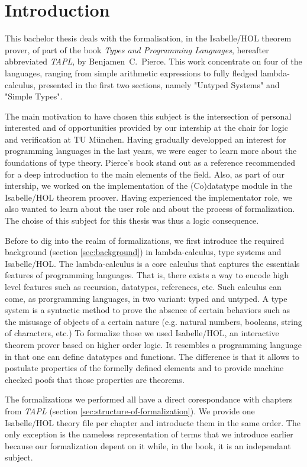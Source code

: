\section{Introduction}

This bachelor thesis deals with the formalisation, in the Isabelle/HOL theorem prover, of part of
the book \emph{Types and Programming Languages}, hereafter abbreviated \emph{TAPL}, by
Benjamen~C.~Pierce. This work concentrate on four of the languages, ranging from simple arithmetic
expressions to fully fledged lambda-calculus, presented in the first two sections, namely "Untyped
Systems" and "Simple Types".

The main motivation to have chosen this subject is the intersection of personal interested and of
opportunities provided by our intership at the chair for logic and verification at TU München.
Having gradually developped an interest for programming languages in the last years, we were eager
to learn more about the foundations of type theory. Pierce's book stand out as a reference
recommended for a deep introduction to the main elements of the field. Also, as part of our
intership, we worked on the implementation of the (Co)datatype module in the Isabelle/HOL theorem
proover. Having experienced the implementator role, we also wanted to learn about the user role and
about the process of formalization. The choise of this subject for this thesis was thus a logic
consequence.

Before to dig into the realm of formalizations, we first introduce the required background (section
\ref{sec:background}) in lambda-calculus, type systems and Isabelle/HOL. The lambda-calculus is a
core calculus that captures the essentials features of programming languages. That is, there exists
a way to encode high level features such as recursion, datatypes, references, etc. Such calculus can
come, as prorgramming languages, in two variant: typed and untyped. A type system is a syntactic
method to prove the absence of certain behaviors such as the misusage of objects of a certain nature
(e.g. natural numbers, booleans, string of characters, etc.) To formalize those we used
Isabelle/HOL, an interactive theorem prover based on higher order logic. It resembles a programming
language in that one can define datatypes and functions. The difference is that it allows to
postulate properties of the formelly defined elements and to provide machine checked poofs that
those properties are theorems.

The formalizations we performed all have a direct corespondance with chapters from \emph{TAPL}
(section \ref{sec:structure-of-formalization}). We provide one Isabelle/HOL theory file per chapter
and introducte them in the same order. The only exception is the nameless representation of terms
that we introduce earlier because our formalization depent on it while, in the book, it is an
independant subject.

